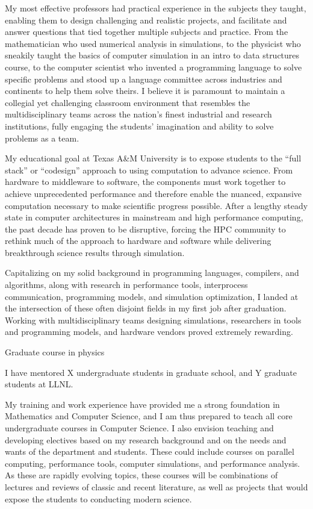 \documentclass[12pt]{article}
\begin{document}
My most effective professors had practical experience in the subjects they taught, enabling them to design challenging and realistic projects, and facilitate and answer questions that tied together multiple subjects and practice.  From the mathematician who used numerical analysis in simulations, to the physicist who sneakily taught the basics of computer simulation in an intro to data structures course, to the computer scientist who invented a programming language to solve specific problems and stood up a language committee across industries and continents to help them solve theirs.  I believe it is paramount to maintain a collegial yet challenging classroom environment that resembles the multidisciplinary teams across the nation's finest industrial and research institutions, fully engaging the students' imagination and ability to solve problems as a team.

My educational goal at Texas A\&M University is to expose students to the ``full stack'' or ``codesign'' approach to using computation to advance science.  From hardware to middleware to software, the components must work together to achieve unprecedented performance and therefore enable the nuanced, expansive computation necessary to make scientific progress possible.  After a lengthy steady state in computer architectures in mainstream and high performance computing, the past decade has proven to be disruptive, forcing the HPC community to rethink much of the approach to hardware and software while delivering breakthrough science results through simulation.

Capitalizing on my solid background in programming languages, compilers, and algorithms, along with research in performance tools, interprocess communication, programming models, and simulation optimization, I landed at the intersection of these often disjoint fields in my first job after graduation.  Working with multidisciplinary teams designing simulations, researchers in tools and programming models, and hardware vendors proved extremely rewarding. ~

Graduate course in physics

I have mentored X undergraduate students in graduate school, and Y graduate students at LLNL.

My training and work experience have provided me a strong foundation in Mathematics and Computer Science, and I am thus prepared to teach all core undergraduate courses in Computer Science.  I also envision teaching and developing electives based on my research background and on the needs and wants of the department and students.  These could include courses on parallel computing, performance tools, computer simulations, and performance analysis.  As these are rapidly evolving topics, these courses will be combinations of lectures and reviews of classic and recent literature, as well as projects that would expose the students to conducting modern science.
\end{document}

